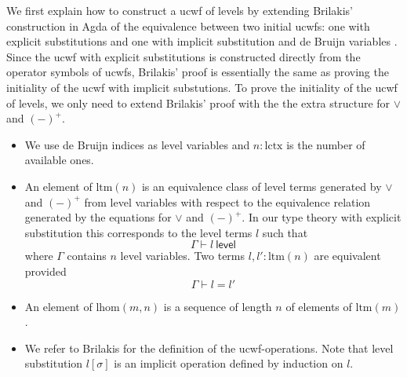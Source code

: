 \documentclass[11pt,a4paper]{article}
\theoremstyle{definition}
\newcommand{\level}{\mathsf{level}}
\def\lhom{\mathrm{lhom}}
\def\lctx{\mathrm{lctx}}
\def\ltm{\mathrm{ltm}}
\def\lp{\mathrm{lp}}
\def\lq{\mathrm{lq}}
\def\s{\mathrm{s}}
\begin{document}
We first explain how to construct a ucwf of levels by extending Brilakis' construction in Agda of the equivalence between two initial ucwfs: one with explicit substitutions and one with implicit substitution and de Bruijn variables \cite{Brilakis18}. Since the ucwf with explicit substitutions is constructed directly from the operator symbols of ucwfs, Brilakis' proof is essentially the same as proving the initiality of the ucwf with implicit substutions. To prove the initiality of the ucwf of levels, we only need to extend Brilakis' proof with the the extra structure for $\vee$ and $(-)^+$.
\begin{itemize}
\item We use de Bruijn indices as level variables and $n : \lctx$ is the number of available ones.
\item An element of $\ltm(n)$ is an equivalence class of level terms generated by $\vee$ and $(-)^+$ from level variables with respect to the equivalence relation generated by the equations for $\vee$ and $(-)^+$. In our type theory with explicit substitution \cite{BezemCDE22} this corresponds to the level terms $l$ such that 
$$
\Gamma \vdash l\ \level
$$
where $\Gamma$ contains $n$ level variables. Two terms $l, l' : \ltm(n)$ are equivalent provided
$$
\Gamma \vdash l = l'
$$
\item An element of $\lhom(m,n)$ is a sequence of length $n$ of elements of $\ltm(m)$.
\item We refer to Brilakis for the definition of the ucwf-operations. Note that level substitution $l[\sigma]$ is an implicit operation defined by induction on $l$.
\end{itemize}
\end{document}
